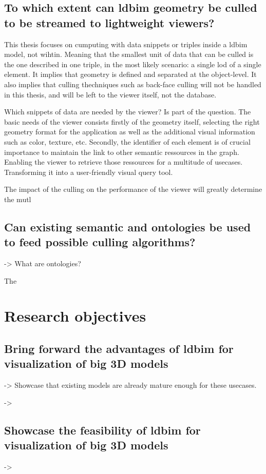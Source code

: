 \subsection[Can \acs{ldbim} be culled?]{To which extent can \acs{ldbim} geometry be culled \\
    to be streamed to lightweight viewers?}
This thesis focuses on cumputing with data snippets or triples inside a \ac{ldbim} model, not wihtin. Meaning that the smallest unit of data that can be culled is the one described in one triple, in the most likely scenario: a single \ac{lod} of a single element. It implies that geometry is defined and separated at the object-level. It also implies that culling thechniques such as back-face culling will not be handled in this thesis, and will be left to the viewer itself, not the database.

Which snippets of data are needed by the viewer? Is part of the question. The basic needs of the viewer consists firstly of the geometry itself, selecting the right geometry format for the application as well as the additional visual information such as color, texture, etc. Secondly, the identifier of each element is of crucial importance to maintain the link to other semantic ressources in the graph. Enabling the viewer to retrieve those ressources for a multitude of usecases. Transforming it into a user-friendly visual query tool.

The impact of the culling on the performance of the viewer will greatly determine the mutl

\subsection[Can existing semantic be used?]{Can existing semantic and ontologies be used\\
    to feed possible culling algorithms?}
-> What are ontologies?

The 



\section{Research objectives}
\subsection[Advantages of LDBIM]{Bring forward the advantages of \acs{ldbim} for visualization of big 3D models}
-> Showcase that existing models are already mature enough for these usecases.

->
\subsection[Showcase the feasibility]{Showcase the feasibility of \acs{ldbim} for visualization of big 3D models}
->